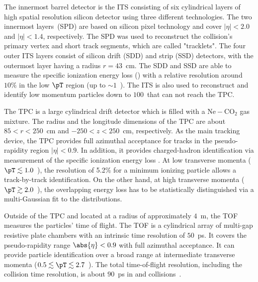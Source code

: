 \documentclass[ALICE,manyauthors]{cernphprep}
\begin{document}
The innermost barrel detector is the ITS consisting of six cylindrical layers of high spatial resolution silicon detector using three different technologies.
The two innermost layers~(SPD) are based on silicon pixel technology and cover $|\eta| < 2.0$ and $|\eta| < 1.4$, respectively.
The SPD was used to reconstruct the collision's primary vertex and short track segments, which are called "tracklets".
The four outer ITS layers consist of silicon drift (SDD) and strip (SSD) detectors, with the outermost layer having a radius $r = 43$~cm.
The SDD and SSD are able to measure the specific ionization energy loss (\dEdx) with a relative resolution around $10\%$ in the low $\pT$ region (up to $\sim 1$~\GeVc).
The ITS is also used to reconstruct and identify low momentum particles down to $100$~\MeVc that can not reach the TPC.

The TPC is a large cylindrical drift detector which is filled with a $\mathrm{Ne-CO_{2}}$ gas mixture.
The radius and the longitude dimensions of the TPC are about $85 < r < 250 $~cm and $-250 < z < 250 $~cm, respectively.
As the main tracking device, the TPC provides full azimuthal acceptance for tracks in the pseudo-rapidity region $|\eta| < 0.9$.
In addition, it provides charged-hadron identification via measurement of the specific ionization energy loss \dEdx.
At low transverse momenta ($\pT \lesssim 1.0$~\GeVc), the \dEdx resolution of 5.2\% for a minimum ionizing particle allows a track-by-track identification. On the other hand, at high transverse momenta ($\pT \gtrsim 2.0$~\GeVc), the overlapping energy loss has to be statistically distinguished via a multi-Gaussian fit to the \dEdx distributions.

Outside of the TPC and located at a radius of approximately $4$~m, the TOF measures the particles' time of flight.
The TOF is a cylindrical array of multi-gap resistive plate chambers with an intrinsic time resolution of $50$~ps.
It covers the pseudo-rapidity range $\abs{\eta} < 0.9$ with full azimuthal acceptance.
It can provide particle identification over a broad range at intermediate transverse momenta ($0.5 \lesssim \pT \lesssim 2.7$~\GeVc).
The total time-of-flight resolution, including the collision time resolution, is about $90$~ps in \pp and \pPb collisions~\cite{Acharya:2020uxl, Jacazio:2018slq}.
\end{document}

